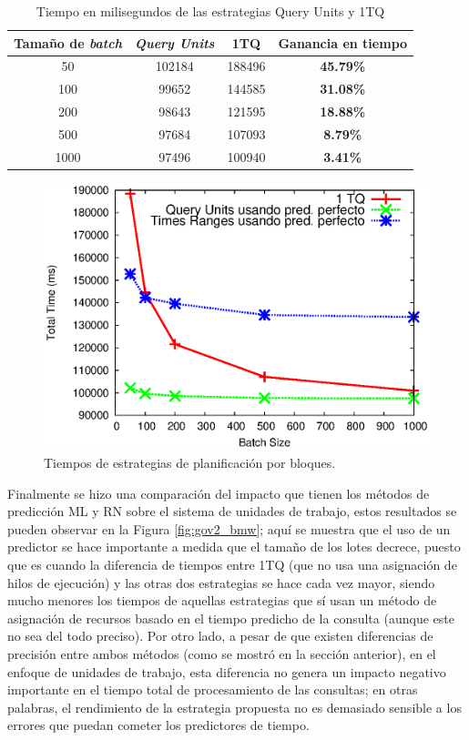 \begin{table}[htbp]
\caption{Tiempo en milisegundos de las estrategias Query Units y 1TQ}
\begin{center}
\begin{tabular}{|c|c|c|c|}
\hline
Tamaño de \textit{batch} & \textit{Query Units} & 1TQ & Ganancia en tiempo \\ \hline
50 & 102184 & 188496 & \textbf{45.79\%} 	\\ \hline
100 & 99652 & 144585 & \textbf{31.08\%} 	\\ \hline
200 & 98643 & 121595 & \textbf{18.88\%} 	\\ \hline
500 & 97684 & 107093 & \textbf{8.79\%} 	\\ \hline
1000 & 97496 & 100940 & \textbf{3.41\%} 	\\ \hline
\end{tabular}
\end{center}
\label{ganancia_queryunits_1tq}
\end{table}

\begin{figure}[tp]
\centering
\includegraphics[scale=.75]{images/units_vs_multithread.eps}
\caption{Tiempos de estrategias de planificación por bloques.}
\label{fig:units_vs_multithread}
\end{figure}

Finalmente se hizo una comparación del impacto que tienen los métodos de predicción ML y RN sobre el sistema de unidades de trabajo, estos resultados se pueden observar en la Figura \ref{fig:gov2_bmw}; aquí se muestra que el uso de un predictor se hace importante a medida que el tamaño de los lotes decrece, puesto que es cuando la diferencia de tiempos entre 1TQ (que no usa una asignación de hilos de ejecución) y las otras dos estrategias se hace cada vez mayor, siendo mucho menores los tiempos de aquellas estrategias que sí usan un método de asignación de recursos basado en el tiempo predicho de la consulta (aunque este no sea del todo preciso). Por otro lado, a pesar de que existen diferencias de precisión entre ambos métodos (como se mostró en la sección anterior), en el enfoque de unidades de trabajo, esta diferencia no genera un impacto negativo importante en el tiempo total de procesamiento de las consultas; en otras palabras, el rendimiento de la estrategia propuesta no es demasiado sensible a los errores que puedan cometer los predictores de tiempo.

